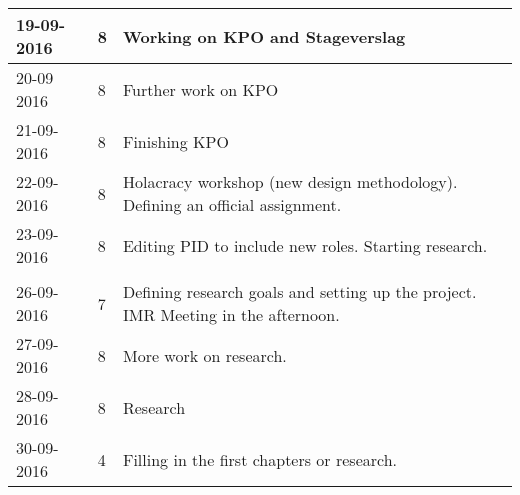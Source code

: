\begin{tabular}{|p{2cm}|p{1cm}|p{10cm}|}
	\\ \hline
	
	19-09-2016 & 8 & Working on KPO and Stageverslag \\ \hline
	20-09 2016 & 8 & Further work on KPO \\ \hline
	21-09-2016 & 8 & Finishing KPO \\ \hline
	22-09-2016 & 8 & Holacracy workshop (new design methodology). Defining an official assignment. \\ \hline
	23-09-2016 & 8 & Editing PID to include new roles. Starting research. \\ \hline
	
	\\ \hline
	
	26-09-2016 & 7 & Defining research goals and setting up the project. IMR Meeting in the afternoon.\\ \hline
	27-09-2016 & 8 & More work on research. \\ \hline
	28-09-2016 & 8 & Research \\ \hline
	30-09-2016 & 4 & Filling in the first chapters or research. \\ \hline
	
\end{tabular}

